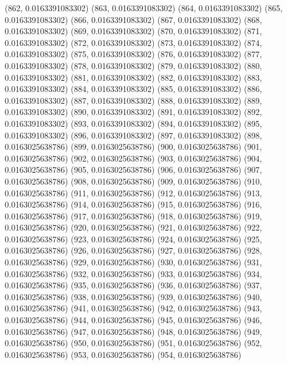{					(862, 0.0163391083302)
					(863, 0.0163391083302)
					(864, 0.0163391083302)
					(865, 0.0163391083302)
					(866, 0.0163391083302)
					(867, 0.0163391083302)
					(868, 0.0163391083302)
					(869, 0.0163391083302)
					(870, 0.0163391083302)
					(871, 0.0163391083302)
					(872, 0.0163391083302)
					(873, 0.0163391083302)
					(874, 0.0163391083302)
					(875, 0.0163391083302)
					(876, 0.0163391083302)
					(877, 0.0163391083302)
					(878, 0.0163391083302)
					(879, 0.0163391083302)
					(880, 0.0163391083302)
					(881, 0.0163391083302)
					(882, 0.0163391083302)
					(883, 0.0163391083302)
					(884, 0.0163391083302)
					(885, 0.0163391083302)
					(886, 0.0163391083302)
					(887, 0.0163391083302)
					(888, 0.0163391083302)
					(889, 0.0163391083302)
					(890, 0.0163391083302)
					(891, 0.0163391083302)
					(892, 0.0163391083302)
					(893, 0.0163391083302)
					(894, 0.0163391083302)
					(895, 0.0163391083302)
					(896, 0.0163391083302)
					(897, 0.0163391083302)
					(898, 0.0163025638786)
					(899, 0.0163025638786)
					(900, 0.0163025638786)
					(901, 0.0163025638786)
					(902, 0.0163025638786)
					(903, 0.0163025638786)
					(904, 0.0163025638786)
					(905, 0.0163025638786)
					(906, 0.0163025638786)
					(907, 0.0163025638786)
					(908, 0.0163025638786)
					(909, 0.0163025638786)
					(910, 0.0163025638786)
					(911, 0.0163025638786)
					(912, 0.0163025638786)
					(913, 0.0163025638786)
					(914, 0.0163025638786)
					(915, 0.0163025638786)
					(916, 0.0163025638786)
					(917, 0.0163025638786)
					(918, 0.0163025638786)
					(919, 0.0163025638786)
					(920, 0.0163025638786)
					(921, 0.0163025638786)
					(922, 0.0163025638786)
					(923, 0.0163025638786)
					(924, 0.0163025638786)
					(925, 0.0163025638786)
					(926, 0.0163025638786)
					(927, 0.0163025638786)
					(928, 0.0163025638786)
					(929, 0.0163025638786)
					(930, 0.0163025638786)
					(931, 0.0163025638786)
					(932, 0.0163025638786)
					(933, 0.0163025638786)
					(934, 0.0163025638786)
					(935, 0.0163025638786)
					(936, 0.0163025638786)
					(937, 0.0163025638786)
					(938, 0.0163025638786)
					(939, 0.0163025638786)
					(940, 0.0163025638786)
					(941, 0.0163025638786)
					(942, 0.0163025638786)
					(943, 0.0163025638786)
					(944, 0.0163025638786)
					(945, 0.0163025638786)
					(946, 0.0163025638786)
					(947, 0.0163025638786)
					(948, 0.0163025638786)
					(949, 0.0163025638786)
					(950, 0.0163025638786)
					(951, 0.0163025638786)
					(952, 0.0163025638786)
					(953, 0.0163025638786)
					(954, 0.0163025638786)
}
